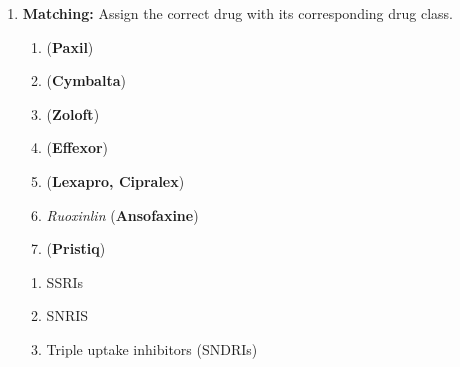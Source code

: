 \begin{enumerate}[label = \textbf{Q4.3.\arabic*}]
    \item \textbf{Matching:} Assign the correct drug with its corresponding drug class.
    \begin{wordbox}
        \begin{enumerate}[label = (\alph*)]
            \item {} (\textbf{Paxil}) %
            \item {} (\textbf{Cymbalta}) %
            \item {} (\textbf{Zoloft}) %
            \item {} (\textbf{Effexor}) %
            \item {} (\textbf{Lexapro, Cipralex}) %
            \item \textit{Ruoxinlin} (\textbf{Ansofaxine}) %
            \item {} (\textbf{Pristiq}) %
        \end{enumerate}
    \end{wordbox}
    \begin{enumerate}[label=(\alph*)]
        \item SSRIs \quad \dotfill \quad \underline{\hspace{3cm}}\\[0.5em]
        \item SNRIS \quad \dotfill \quad \underline{\hspace{3cm}}\\[0.5em]
        \item Triple uptake inhibitors (SNDRIs) \quad \dotfill \quad \underline{\hspace{3cm}}
    \end{enumerate}
\end{enumerate}

\squigglyline
\newpage
